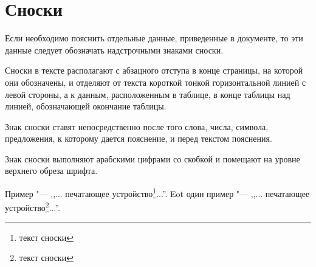 \documentclass[russian,utf8,footnoteasterisk]{eskdtext}
\begin{document}
\section{Сноски}
\point Если необходимо пояснить отдельные данные, приведенные в
документе, то эти данные следует обозначать надстрочными знаками
сноски.

Сноски в тексте располагают с абзацного отступа в конце страницы, на
которой они обозначены, и отделяют от текста короткой тонкой
горизонтальной линией с левой стороны, а к данным, расположенным в
таблице, в конце таблицы над линией, обозначающей окончание таблицы.

\point Знак сноски ставят непосредственно после того слова, числа,
символа, предложения, к которому дается пояснение, и перед текстом
пояснения.

\point Знак сноски выполняют арабскими цифрами со скобкой и помещают
на уровне верхнего обреза шрифта.

Пример "--- ,,... печатающее устройство\footnote{текст сноски}...''.
\newpage
Eot один пример "--- ,,... печатающее устройство\footnote{текст сноски}...''.
\end{document}
